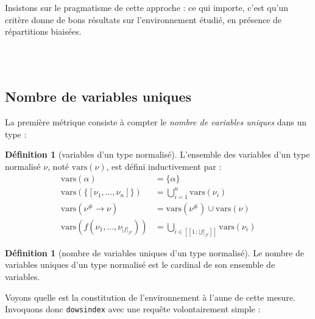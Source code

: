 \documentclass[a4paper]{report}
\theoremstyle{definition}
\newtheorem{definition}[theoreme]{Définition}
\newcommand{\dowsindex}{\texttt{dowsindex}\xspace}
\newcommand{\interval}[2]{[\![#1\,;#2]\!]}
\newcommand{\mset}[1]{\{\![#1]\!\}}
\newcommand{\F}{\mathscr{F}}
\newcommand\gab[1]{{\bf\color{Orange}{TODO: #1}}\\}
\begin{document}
Insistons sur le pragmatisme de cette approche : ce qui importe, c'est qu'un critère donne de bons résultats sur l'environnement étudié, en présence de répartitions biaisées.


\gab{Dans la présentation de la suite, j'ai l'impression que tu essayes de faire 2 choses en même temps: 1. Présenter les mesures , et donner une intuition des critères qui s'en servent. Je ne suis pas convaincu qu'il faille absolument faire les 2 en même temps. Tu vas de toute façon voir les critères en détails juste après. En pratique, le petit 1 est assez clair et compréhensible, mais le petit 2 est souvent beaucoup plus confus (car tu n'as pas encore donné la vrai définition).}

\gab{Globalement, dans toutes les mesures présentées, il manque des exemples}

\subsection{Nombre de variables uniques}

La première métrique consiste à compter le \emph{nombre de variables uniques} dans un type :

\begin{definition}[variables d'un type normalisé]
  L'ensemble des variables d'un type normalisé $\nu$, noté $\mathrm{vars} (\nu)$, est défini inductivement par :
  \begin{align*}
      \mathrm{vars} (\alpha) &=
      \{ \alpha \}
    \\
      \mathrm{vars} (\mset{\nu_1, \dots, \nu_n}) &=
      \bigcup _{i=1}^n \mathrm{vars} (\nu_i)
    \\
      \mathrm{vars} (\nu^\# \rightarrow \nu) &=
      \mathrm{vars} (\nu^\#) \cup \mathrm{vars} (\nu)
    \\
      \mathrm{vars} (f (\nu_1, \dots, \nu_{|f|_\F})) &=
      \bigcup_{i \in \interval 1 {|f|_\F}} \mathrm{vars} (\nu_i)
  \end{align*}
\end{definition}

\begin{definition}[nombre de variables uniques d'un type normalisé]
  Le nombre de variables uniques d'un type normalisé est le cardinal de son ensemble de variables.
\end{definition}

Voyons quelle est la constitution de l'environnement à l'aune de cette mesure. Invoquons donc \dowsindex avec une requête volontairement simple :
\end{document}

